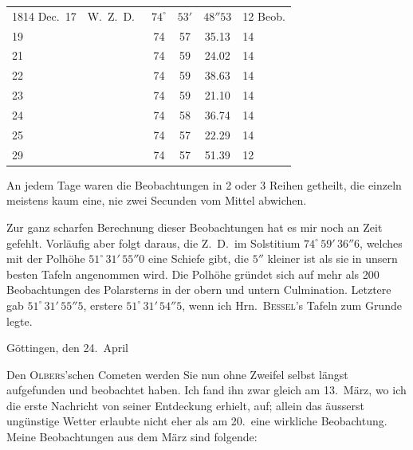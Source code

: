 \begin{center}
\fontsize{10}{12}\selectfont\setlength{\tabcolsep}{5pt}\renewcommand{\arraystretch}{1.15}\begin{tabular}{l l ccc l}
1814 Dec.\ 17 & W.\ Z.\ D.\ & $74^\circ$ & $53'$ & $48''53$ & 12 Beob. \\
19 & & 74 & 57 & 35.13 & 14 \\
21 & & 74 & 59 & 24.02 & 14 \\
22 & & 74 & 59 & 38.63 & 14 \\
23 & & 74 & 59 & 21.10 & 14 \\
24 & & 74 & 58 & 36.74 & 14 \\
25 & & 74 & 57 & 22.29 & 14 \\
29 & & 74 & 57 & 51.39 & 12 \\
\end{tabular}
\end{center}

\par\indent An jedem Tage waren die Beobachtungen in 2 oder 3 Reihen getheilt, die einzeln meistens kaum eine, nie zwei Secunden vom Mittel abwichen.

\par\indent Zur ganz scharfen Berechnung dieser Beobachtungen hat es mir noch an Zeit gefehlt. Vorläufig aber folgt daraus, die Z.\ D.\ im Solstitium $74^\circ\,59'\,36''6$, welches mit der Polhöhe $51^\circ\,31'\,55''0$ eine Schiefe gibt, die $5''$ kleiner ist als sie in unsern besten Tafeln angenommen wird. Die Polhöhe gründet sich auf mehr als 200 Beobachtungen des Polarsterns in der obern und untern Culmination. Letztere gab $51^\circ\,31'\,55''5$, erstere $51^\circ\,31'\,54''5$, wenn ich Hrn.\ \textsc{Bessel}'s Tafeln zum Grunde legte.

\begin{flushright}
Göttingen, den 24.\ April
\end{flushright}

\par\indent Den \textsc{Olbers}'schen Cometen werden Sie nun ohne Zweifel selbst längst aufgefunden und beobachtet haben. Ich fand ihn zwar gleich am 13.\ März, wo ich die erste Nachricht von seiner Entdeckung erhielt, auf; allein das äusserst ungünstige Wetter erlaubte nicht eher als am 20.\ eine wirkliche Beobachtung. Meine Beobachtungen aus dem März sind folgende:

